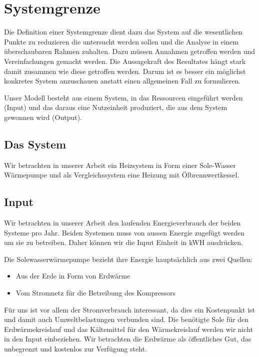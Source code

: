 \chapter{Systemgrenze}
\label{chap:Systemgrenze}

Die Definition einer Systemgrenze dient dazu das System auf die wesentlichen
Punkte zu reduzieren die untersucht werden sollen und die Analyse in einem
überschaubaren Rahmen zuhalten.
Dazu müssen Annahmen getroffen werden und Vereinfachungen gemacht werden.
Die Aussagekraft des Resultates hängt stark damit zusammen wie diese getroffen
werden. Darum ist es besser ein möglichst konkretes System anzuschauen anstatt
einen allgemeinen Fall zu formulieren.

Unser Modell besteht aus einem System, in das Ressourcen eingeführt werden
(Input) und das daraus eine Nutzeinheit produziert, die aus dem System gewonnen
wird (Output).

\section{Das System}

Wir betrachten in unserer Arbeit ein Heizsystem in Form einer
Sole-Wasser Wärmepumpe und als Vergleichssystem eine Heizung mit
Ölbrennwertkessel.

\section{Input}

Wir betrachten in unserer Arbeit den laufenden Energieverbrauch der beiden
Systeme pro Jahr.
Beiden Systemen muss von aussen Energie zugefügt werden um sie zu betreiben.
Daher können wir die Input Einheit in kWH ausdrücken.

Die Solewasserwärmepumpe bezieht ihre Energie hauptsächlich aus zwei Quellen:
\begin{itemize}
\item Aus der Erde in Form von Erdwärme
\item Vom Stromnetz für die Betreibung des Kompressors
\end{itemize}

Für uns ist vor allem der Stromverbrauch interessant, da dies ein Kostenpunkt
ist und damit auch Umweltbelastungen verbunden sind. Die benötigte Sole für den Erdwärmekreislauf und das Kältemittel für den Wärmekreislauf werden wir nicht in den Input einbeziehen. Wir betrachten die Erdwärme als öffentliches Gut, das unbegrenzt und kostenlos zur Verfügung steht.

